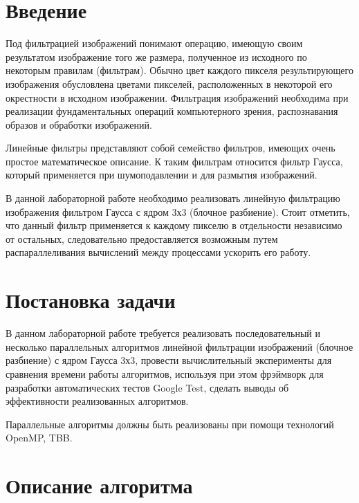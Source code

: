 \documentclass{report}
\begin{document}
\setcounter{page}{2}

\tableofcontents
\newpage

\section*{Введение}
\par Под фильтрацией изображений понимают операцию, имеющую своим результатом изображение того же размера, полученное из исходного по некоторым правилам (фильтрам). Обычно цвет каждого пикселя результирующего изображения обусловлена цветами пикселей, расположенных в некоторой его окрестности в исходном изображении. Фильтрация изображений необходима при реализации фундаментальных операций компьютерного зрения, распознавания образов и обработки изображений. 
\par Линейные фильтры представляют собой семейство фильтров, имеющих очень простое математическое описание. К таким фильтрам относится фильтр Гаусса, который применяется при шумоподавлении и для размытия изображений.
\par В данной лабораторной работе необходимо реализовать линейную фильтрацию изображения фильтром Гаусса с ядром 3х3 (блочное разбиение). Стоит отметить, что данный фильтр применяется к каждому пикселю в отдельности независимо от остальных, следовательно предоставляется возможным путем распараллеливания вычислений между процессами ускорить его работу.

\newpage

\section*{Постановка задачи}
\par В данном лабораторной работе требуется реализовать последовательный и несколько параллельных алгоритмов  линейной фильтрации изображений (блочное разбиение) с ядром Гаусса 3х3, провести вычислительный эксперименты для сравнения времени работы алгоритмов, используя при этом фрэймворк для разработки автоматических тестов Google Test, сделать выводы об эффективности реализованных алгоритмов.

\par Параллельные алгоритмы должны быть реализованы при помощи технологий OpenMP, TBB.
\newpage

\section*{Описание алгоритма}
\end{document}
